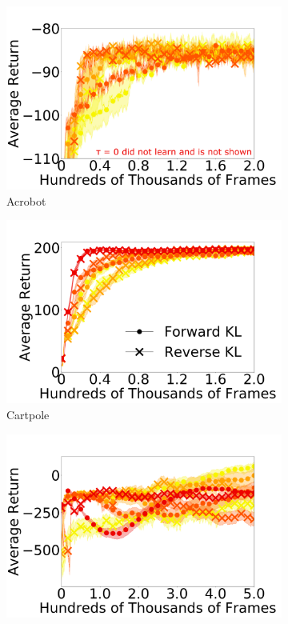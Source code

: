 \documentclass[twoside,11pt]{article}
\begin{document}
\begin{figure}[t]
  \centering
  \begin{subfigure}[b]{0.25\linewidth}
    \centering
    \includegraphics[width=\columnwidth]{figs/deep/discrete/labeled_acrobot.png} 
    \caption{Acrobot
    }\label{fig:acrobot}
  \end{subfigure}%
  \begin{subfigure}[b]{0.25\linewidth}
    \centering
    \includegraphics[width=\columnwidth]{figs/deep/discrete/CartPole_all_kl.png} 
    \caption{Cartpole
    }\label{fig:cartpole}
  \end{subfigure}%
  \begin{subfigure}[b]{0.25\linewidth}
    \centering
    \includegraphics[width=\columnwidth]{figs/deep/discrete/UNLABELED_LunarLander_all_kl.png}

\end{subfigure}
\end{figure}
\end{document}
